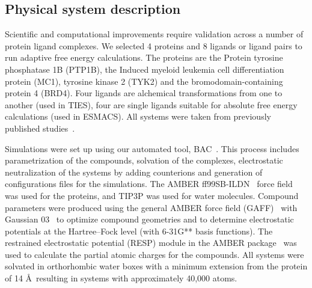 \subsection{Physical system description}

Scientific and computational improvements require validation across a number
of protein ligand complexes. We selected 4 proteins and 8 ligands or ligand
pairs to run adaptive free energy calculations. The proteins are the Protein
tyrosine phosphatase 1B (PTP1B), the Induced myeloid leukemia cell
differentiation protein (MC1), tyrosine kinase 2 (TYK2) and the
bromodomain-containing protein 4 (BRD4). Four ligands are alchemical
transformations from one to another (used in TIES), four are single ligands
suitable for absolute free energy calculations (used in ESMACS). All systems
were taken from previously published studies~\cite{Bhati2017}.

Simulations were set up using our automated tool, BAC~\cite{Sadiq2008}. This
process includes parametrization of the compounds, solvation of the
complexes, electrostatic neutralization of the systems by adding counterions
and generation of configurations files for the simulations. The AMBER
ff99SB-ILDN~\cite{Lindorff-Larsen2010} force field was used for the proteins,
and TIP3P was used for water molecules. Compound parameters were produced
using the general AMBER force field (GAFF)~\cite{Wang2004} with Gaussian
03~\cite{Frisch} to optimize compound geometries and to determine
electrostatic potentials at the Hartree–Fock level (with 6-31G** basis
functions). The restrained electrostatic potential (RESP) module in the AMBER
package~\cite{Case2005} was used to calculate the partial atomic charges for
the compounds. All systems were solvated in orthorhombic water boxes with a
minimum extension from the protein of 14 \AA\, resulting in systems with
approximately 40,000 atoms.

